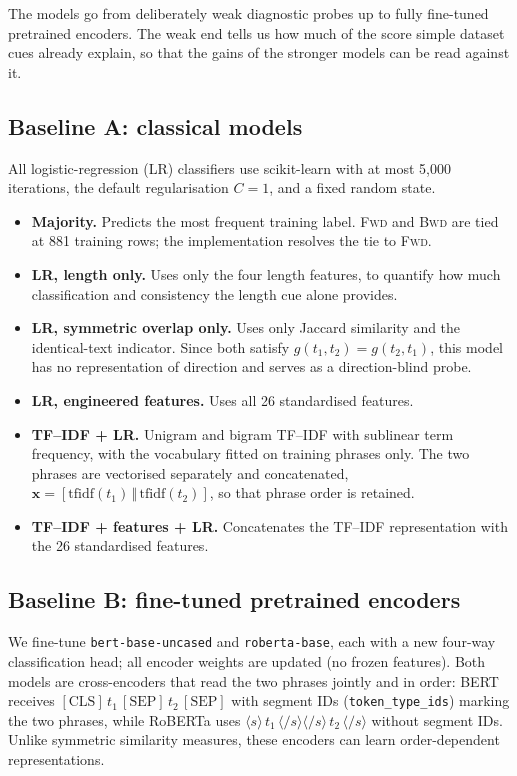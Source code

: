\documentclass[11pt,a4paper]{article}
\newcommand{\FWD}{\textsc{Fwd}}
\newcommand{\BWD}{\textsc{Bwd}}
\begin{document}
The models go from deliberately weak diagnostic probes up to fully fine-tuned pretrained encoders. The weak end tells us how much of the score simple dataset cues already explain, so that the gains of the stronger models can be read against it.

\subsection{Baseline A: classical models}
All logistic-regression (LR) classifiers use scikit-learn with at most 5{,}000 iterations, the default regularisation $C=1$, and a fixed random state.
\begin{itemize}
  \item \textbf{Majority.} Predicts the most frequent training label. \FWD{} and \BWD{} are tied at 881 training rows; the implementation resolves the tie to \FWD.
  \item \textbf{LR, length only.} Uses only the four length features, to quantify how much classification and consistency the length cue alone provides.
  \item \textbf{LR, symmetric overlap only.} Uses only Jaccard similarity and the identical-text indicator. Since both satisfy $g(t_1,t_2)=g(t_2,t_1)$, this model has no representation of direction and serves as a direction-blind probe.
  \item \textbf{LR, engineered features.} Uses all 26 standardised features.
  \item \textbf{TF--IDF + LR.} Unigram and bigram TF--IDF with sublinear term frequency, with the vocabulary fitted on training phrases only. The two phrases are vectorised separately and concatenated, $\mathbf{x}=[\mathrm{tfidf}(t_1)\,\Vert\,\mathrm{tfidf}(t_2)]$, so that phrase order is retained.
  \item \textbf{TF--IDF + features + LR.} Concatenates the TF--IDF representation with the 26 standardised features.
\end{itemize}

\subsection{Baseline B: fine-tuned pretrained encoders}
We fine-tune \texttt{bert-base-uncased} and \texttt{roberta-base}, each with a new four-way classification head; all encoder weights are updated (no frozen features). Both models are cross-encoders that read the two phrases jointly and in order: BERT receives $[\mathrm{CLS}]\,t_1\,[\mathrm{SEP}]\,t_2\,[\mathrm{SEP}]$ with segment IDs (\texttt{token\_type\_ids}) marking the two phrases, while RoBERTa uses $\langle s\rangle\,t_1\,\langle/s\rangle\langle/s\rangle\,t_2\,\langle/s\rangle$ without segment IDs. Unlike symmetric similarity measures, these encoders can learn order-dependent representations.
\end{document}
